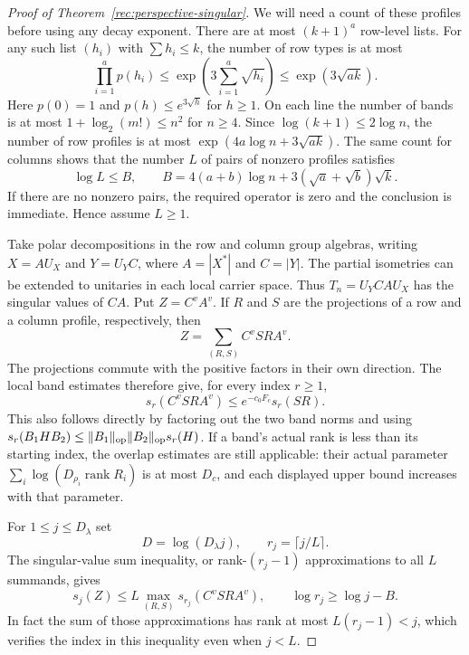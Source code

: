 \begin{proof}[Proof of Theorem~\ref{rec:perspective-singular}]
We will need a count of these profiles before using any decay
exponent.  There are at most $(k+1)^a$ row-level lists.
For any such list $(h_i)$ with $\sum h_i\le k$, the number of
row types is at most
\[
 \prod_{i=1}^a p(h_i)
 \le\exp\left(3\sum_{i=1}^a\sqrt{h_i}\right)
 \le\exp(3\sqrt{ak}).
\]
Here $p(0)=1$ and $p(h)\le e^{3\sqrt h}$ for $h\ge1$.
On each line the number of bands is at most
$1+\log_2(m!)\le n^2$ for $n\ge4$.  Since
$\log(k+1)\le2\log n$, the number of row profiles is at most
$\exp(4a\log n+3\sqrt{ak})$.  The same count for columns shows
that the number $L$ of pairs of nonzero profiles satisfies
\begin{equation}\label{grid:perspective-profile-count}
 \log L\le B,
 \qquad B=4(a+b)\log n+3(\sqrt a+\sqrt b)\sqrt k.
\end{equation}
If there are no nonzero pairs, the required operator is zero and
the conclusion is immediate.  Hence assume $L\ge1$.

Take polar decompositions in the row and column group algebras,
writing $X=A U_X$ and $Y=U_Y C$, where
$A=|X^*|$ and $C=|Y|$.  The partial isometries can be extended to
unitaries in each local carrier space.  Thus $T_n=U_YCAU_X$ has
the singular values of $CA$.  Put $Z=C^vA^v$.  If $R$ and $S$
are the projections of a row and a column profile, respectively,
then
\[
 Z=\sum_{(R,S)} C^v S R A^v.
\]
The projections commute with the positive factors in their own
direction.  The local band estimates therefore give, for every
index $r\ge1$,
\begin{equation}\label{grid:perspective-profile-singular}
 s_r(C^vSRA^v)\le e^{-c_0F_c}s_r(SR).
\end{equation}
This also follows directly by factoring out the two band norms
and using $s_r(B_1HB_2)\le\|B_1\|_{\mathrm{op}}\|B_2\|_{\mathrm{op}}s_r(H)$.
If a band's actual rank is less than its starting index, the
overlap estimates are still applicable: their actual parameter
$\sum_i\log(D_{\rho_i}\operatorname{rank}R_i)$ is at most
$D_c$, and each displayed upper bound increases with that
parameter.

For $1\le j\le D_\lambda$ set
\[
 D=\log(D_\lambda j),\qquad r_j=\lceil j/L\rceil.
\]
The singular-value sum inequality, or rank-$(r_j-1)$
approximations to all $L$ summands, gives
\begin{equation}\label{grid:perspective-rank-allocation}
 s_j(Z)\le L\max_{(R,S)}s_{r_j}(C^vSRA^v),
 \qquad \log r_j\ge\log j-B.
\end{equation}
In fact the sum of those approximations has rank at most
$L(r_j-1)<j$, which verifies the index in this inequality even
when $j<L$.


\end{proof}
